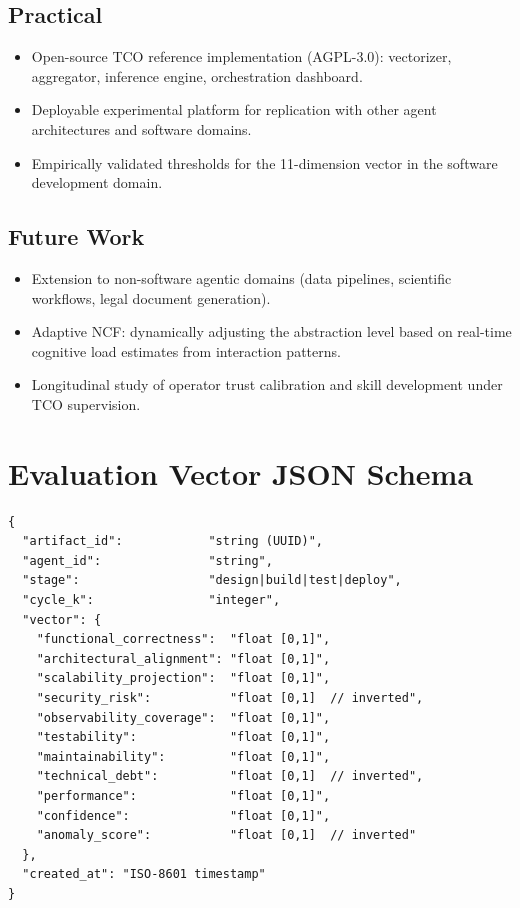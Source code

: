 \documentclass[manuscript,review,anonymous]{acmart}
\begin{document}
\subsection{Practical}

\begin{itemize}
  \item Open-source TCO reference implementation (AGPL-3.0): vectorizer,
    aggregator, inference engine, orchestration dashboard.
  \item Deployable experimental platform for replication with other agent
    architectures and software domains.
  \item Empirically validated thresholds for the 11-dimension vector in the
    software development domain.
\end{itemize}

\subsection{Future Work}

\begin{itemize}
  \item Extension to non-software agentic domains (data pipelines, scientific
    workflows, legal document generation).
  \item Adaptive NCF: dynamically adjusting the abstraction level based on
    real-time cognitive load estimates from interaction patterns.
  \item Longitudinal study of operator trust calibration and skill development
    under TCO supervision.
\end{itemize}




\appendix
\section{Evaluation Vector JSON Schema}

\begin{lstlisting}[language={}]
{
  "artifact_id":            "string (UUID)",
  "agent_id":               "string",
  "stage":                  "design|build|test|deploy",
  "cycle_k":                "integer",
  "vector": {
    "functional_correctness":  "float [0,1]",
    "architectural_alignment": "float [0,1]",
    "scalability_projection":  "float [0,1]",
    "security_risk":           "float [0,1]  // inverted",
    "observability_coverage":  "float [0,1]",
    "testability":             "float [0,1]",
    "maintainability":         "float [0,1]",
    "technical_debt":          "float [0,1]  // inverted",
    "performance":             "float [0,1]",
    "confidence":              "float [0,1]",
    "anomaly_score":           "float [0,1]  // inverted"
  },
  "created_at": "ISO-8601 timestamp"
}
\end{lstlisting}
\end{document}
